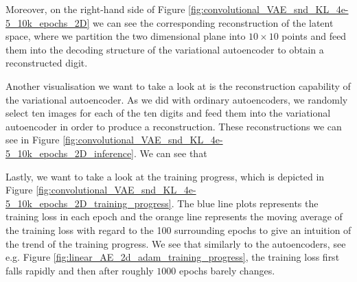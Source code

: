 Moreover, on the right-hand side of Figure \ref{fig:convolutional_VAE_snd_KL_4e-5_10k_epochs_2D} we can see the corresponding reconstruction of the latent space, where we partition the two dimensional plane into $10\times 10$ points and feed them into the decoding structure of the variational autoencoder to obtain a reconstructed digit.

Another visualisation we want to take a look at is the reconstruction capability of the variational autoencoder. As we did with ordinary autoencoders, we randomly select ten images for each of the ten digits and feed them into the variational autoencoder in order to produce a reconstruction. These reconstructions we can see in Figure \ref{fig:convolutional_VAE_snd_KL_4e-5_10k_epochs_2D_inference}. We can see that

Lastly, we want to take a look at the training progress, which is depicted in Figure \ref{fig:convolutional_VAE_snd_KL_4e-5_10k_epochs_2D_training_progress}. The blue line plots represents the training loss in each epoch and the orange line represents the moving average of the training loss with regard to the 100 surrounding epochs to give an intuition of the trend of the training progress. We see that similarly to the autoencoders, see e.g. Figure \ref{fig:linear_AE_2d_adam_training_progress}, the training loss first falls rapidly and then after roughly $1000$ epochs barely changes.

